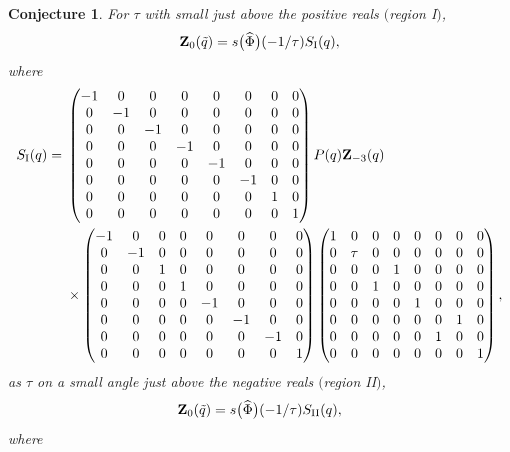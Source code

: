 \documentclass[pdftex]{sigma}
\numberwithin{equation}{section}
\newtheorem{Conjecture}[Theorem]{Conjecture}
\def\tq{\tilde{q}}
\def\Phih{\widehat{\Phi}}
\def\tq{\tilde{q}}
\begin{document}
\begin{Conjecture}\label{conj:borel}\setlength{\arraycolsep}{4pt}
For $\tau$ with small just above the positive reals $($region {\rm I}$)$,
\[
\mathbf{Z}_{0}(\tq) =s\bigl(\Phih\bigr)(-1/\tau)S_{\rm I}(q),
\]
where
\begin{align*}
S_{\rm I}(q) ={}&\begin{pmatrix}
 -1 & 0 & 0 & 0 & 0 & 0 & 0 & 0\\
 0 & -1 & 0 & 0 & 0 & 0 & 0 & 0\\
 0 & 0 & -1 & 0 & 0 & 0 & 0 & 0\\
 0 & 0 & 0 & -1 & 0 & 0 & 0 & 0\\
 0 & 0 & 0 & 0 & -1 & 0 & 0 & 0\\
 0 & 0 & 0 & 0 & 0 & -1 & 0 & 0\\
 0 & 0 & 0 & 0 & 0 & 0 & 1 & 0\\
 0 & 0 & 0 & 0 & 0 & 0 & 0 & 1
\end{pmatrix}P(q)\mathbf{Z}_{-3}(q)\\
&\times
\begin{pmatrix}
 -1 & 0 & 0 & 0 & 0 & 0 & 0 & 0\\
 0 & -1 & 0 & 0 & 0 & 0 & 0 & 0\\
 0 & 0 & 1 & 0 & 0 & 0 & 0 & 0\\
 0 & 0 & 0 & 1 & 0 & 0 & 0 & 0\\
 0 & 0 & 0 & 0 & -1 & 0 & 0 & 0\\
 0 & 0 & 0 & 0 & 0 & -1 & 0 & 0\\
 0 & 0 & 0 & 0 & 0 & 0 & -1 & 0\\
 0 & 0 & 0 & 0 & 0 & 0 & 0 & 1
\end{pmatrix}
\begin{pmatrix}
 1 & 0 & 0 & 0 & 0 & 0 & 0 & 0\\
 0 & \tau & 0 & 0 & 0 & 0 & 0 & 0\\
 0 & 0 & 0 & 1 & 0 & 0 & 0 & 0\\
 0 & 0 & 1 & 0 & 0 & 0 & 0 & 0\\
 0 & 0 & 0 & 0 & 1 & 0 & 0 & 0\\
 0 & 0 & 0 & 0 & 0 & 0 & 1 & 0\\
 0 & 0 & 0 & 0 & 0 & 1 & 0 & 0\\
 0 & 0 & 0 & 0 & 0 & 0 & 0 & 1
\end{pmatrix},
\end{align*}
as $\tau$ on a small angle just above the negative reals $($region {\rm II}$)$,
\[
\mathbf{Z}_{0}(\tq) =s\bigl(\Phih\bigr)(-1/\tau)S_{\rm II}(q),
\]
where
\begin{align*}

\end{align*}
\end{Conjecture}
\end{document}
